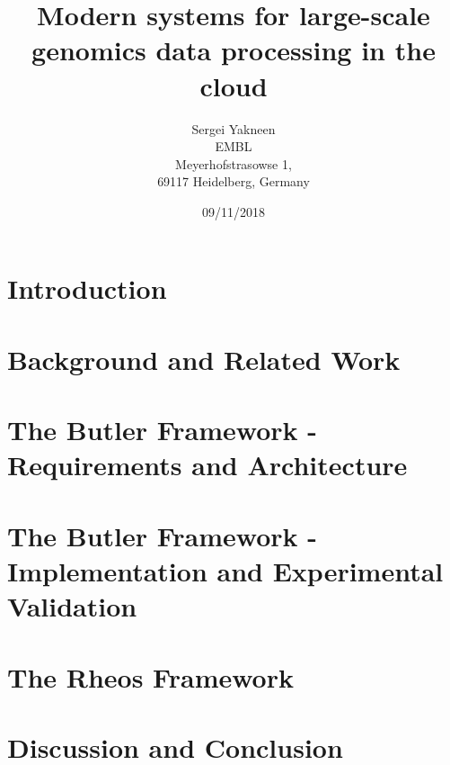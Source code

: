 \documentclass[12pt, twoside]{report}
\title{
	{Modern systems for large-scale genomics data processing in the cloud}\\
}
\author{Sergei Yakneen\\ EMBL\\ Meyerhofstrasowse 1,\\ 69117 Heidelberg, Germany}
\date{09/11/2018}
\begin{document}
\maketitle

\tableofcontents

\chapter{Introduction} \label{ch:introduction}


\chapter{Background and Related Work} \label{ch:background}

	 
\chapter{The Butler Framework - Requirements and Architecture} \label{ch:butler_architecture}
%

\chapter{The Butler Framework - Implementation and Experimental Validation} \label{ch:butler_implementation}
%

\chapter{The Rheos Framework} \label{ch:rheos_framework}


\chapter{Discussion and Conclusion} \label{ch:conclusion}
%

\label{ch:appendices}


\printbibliography
\end{document}
